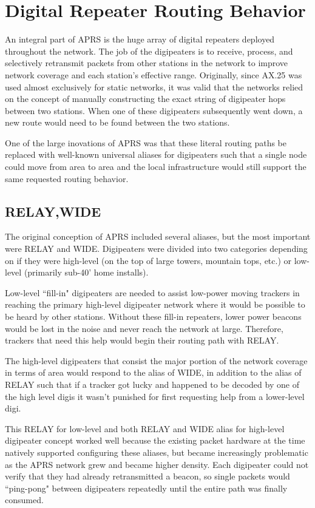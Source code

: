 \chapter{Digital Repeater Routing Behavior}

An integral part of APRS is the huge array of digital repeaters deployed throughout the network.
The job of the digipeaters is to receive, process, and selectively retransmit packets from other 
stations in the network to improve network coverage and each station's effective range.
Originally, since AX.25 was used almost exclusively for static networks, it was valid that
the networks relied on the concept of manually constructing the exact string of digipeater hops
between two stations. When one of these digipeaters subsequently went down, a new route would 
need to be found between the two stations.

One of the large inovations of APRS was that these literal routing paths be replaced with 
well-known universal aliases for digipeaters such that a single node could move from area to
area and the local infrastructure would still support the same requested routing behavior.

\section{RELAY,WIDE}

The original conception of APRS included several aliases, but the most important were RELAY
and WIDE. Digipeaters were divided into two categories depending on if they were high-level
(on the top of large towers, mountain tops, etc.) or low-level (primarily sub-40' home installs).

Low-level ``fill-in" digipeaters are needed to assist low-power moving trackers in reaching the
primary high-level digipeater network where it would be possible to be heard by other stations.
Without these fill-in repeaters, lower power beacons would be lost in the noise and never reach the 
network at large. Therefore, trackers that need this help would begin their routing path with RELAY.

The high-level digipeaters that consist the major portion of the network coverage in terms of area
would respond to the alias of WIDE, in addition to the alias of RELAY such that if a tracker got
lucky and happened to be decoded by one of the high level digis it wasn't punished for first requesting 
help from a lower-level digi.

This RELAY for low-level and both RELAY and WIDE alias for high-level digipeater concept worked well
because the existing packet hardware at the time natively supported configuring these aliases, but
became increasingly problematic as the APRS network grew and became higher density. Each digipeater
could not verify that they had already retransmitted a beacon, so single packets would ``ping-pong" 
between digipeaters repeatedly until the entire path was finally consumed.

